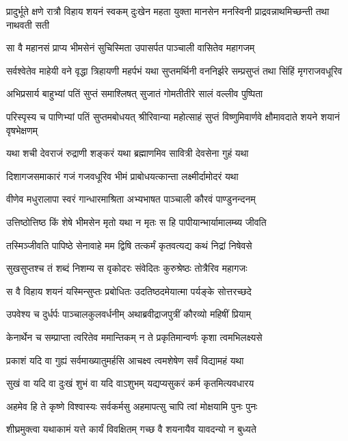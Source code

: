 \threelineshloka
{प्रादुर्भूते क्षणे रात्रौ विहाय शयनं स्वकम्}
{दुःखेन महता युक्ता मानसेन मनस्विनी}
{प्राद्रवन्नाथमिच्छन्ती तथा नाथवती सती}


\twolineshloka
{सा वै महानसं प्राप्य भीमसेनं सुचिस्मिता}
{उपासर्पत पाञ्चाली वासितेव महागजम्}


\threelineshloka
{सर्वश्वेतेव माहेयी वने वृद्धा त्रिहायणी}
{महर्पभं यथा सुप्तमर्थिनी वननिर्झरे}
{सम्प्रसुप्तं तथा सिंहिं मृगराजवधूरिव}


\twolineshloka
{अभिप्रसार्य बाहुभ्यां पतिं सुप्तं समाश्लिषत्}
{सुजातं गोमतीतीरे सालं वल्लीव पुष्पिता}


\threelineshloka
{परिस्पृस्य च पाणिभ्यां पतिं सुप्तमबोधयत्}
{श्रीरिवान्या महोत्साहं सुप्तं विष्णुमिवार्णवे}
{क्षौमावदाते शयने शयानं वृषभेक्षणम्}


\twolineshloka
{यथा शची देवराजं रुद्राणी शङ्करं यथा}
{ब्रह्माणमिव सावित्री देवसेना गुहं यथा}


\twolineshloka
{दिशागजसमाकारं गजं गजवधूरिव}
{भीमं प्राबोधयत्कान्ता लक्ष्मीर्दामोदरं यथा}


\twolineshloka
{वीणेव मधुरालापा स्वरं गान्धारमाश्रिता}
{अभ्यभाषत पाञ्चाली कौरवं पाण्डुनन्दनम्}


\twolineshloka
{उत्तिष्ठोत्तिष्ठ किं शेषे भीमसेन मृतो यथा}
{न मृतः स हि पापीयान्भार्यामालम्ब्य जीवति}


\twolineshloka
{तस्मिञ्जीवति पापिष्ठे सेनावाहे मम द्विषि}
{तत्कर्मं कृतवत्यद्य कथं निद्रां निषेवसे}



\twolineshloka
{सुखसुप्तश्च तं शब्दं निशम्य स वृकोदरः}
{संवेदितः कुरुश्रेष्ठः तोत्रैरिव महागजः}


\twolineshloka
{स वै विहाय शयनं यस्मिन्सुप्तः प्रबोधितः}
{उदतिष्ठदमेयात्मा पर्यङ्के सोत्तरच्छदे}


\twolineshloka
{उपवेश्य च दुर्धर्पः पाञ्चालकुलवर्धनीम्}
{अथाब्रवीद्राजपुत्रीं कौरव्यो महिषीं प्रियाम्}


\twolineshloka
{केनार्थेन च सम्प्राप्ता त्वरितेव ममान्तिकम्}
{न ते प्रकृतिमान्वर्णः कृशा त्वमभिलक्ष्यसे}


\twolineshloka
{प्रकाशं यदि वा गुह्यं सर्वमाख्यातुमर्हसि}
{आचक्ष्व त्वमशेषेण सर्वं विद्यामहं यथा}


\twolineshloka
{सुखं वा यदि वा दुःखं शुभं वा यदि वाऽशुभम्}
{यद्यप्यसुकरं कर्म कृतमित्यवधारय}


\twolineshloka
{अहमेव हि ते कृष्णे विश्वास्यः सर्वकर्मसु}
{अहमापत्सु चापि त्वां मोक्षयामि पुनः पुनः}


\twolineshloka
{शीघ्रमुक्त्वा यथाकामं यत्ते कार्यं विवक्षितम्}
{गच्छ वै शयनायैव यावदन्यो न बुध्यते}


